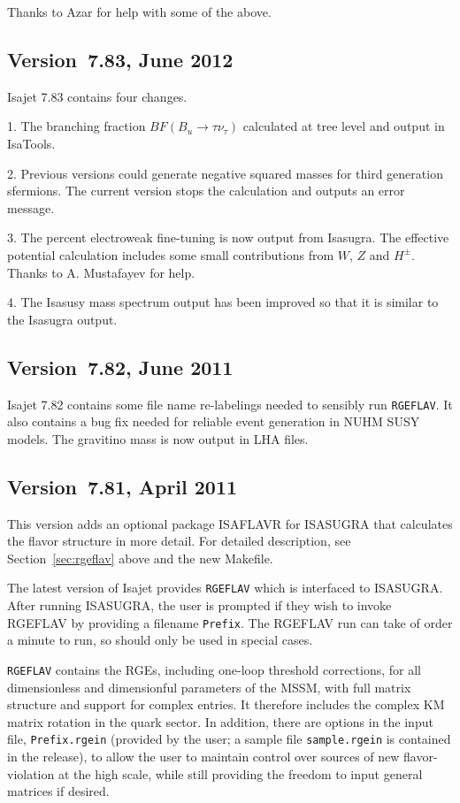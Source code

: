 Thanks to Azar for help with some of the above.

\subsection{Version~7.83, June 2012}

Isajet 7.83 contains four changes. 

1. The branching fraction $BF(B_u\rightarrow\tau\nu_\tau )$ calculated
at tree level and output in IsaTools.

2. Previous versions could generate negative squared masses for third 
generation sfermions. The current version stops the calculation and
outputs an error message.

3. The percent electroweak fine-tuning is now output from Isasugra.
The effective potential calculation includes some small contributions from
$W$, $Z$ and $H^\pm$. Thanks to A. Mustafayev for help.

4. The Isasusy mass spectrum output has been improved so that it is similar to
the Isasugra output.

\subsection{Version~7.82, June 2011}

Isajet 7.82 contains some file name re-labelings needed to sensibly run \texttt{RGEFLAV}.
It also contains a bug fix needed for reliable event generation in NUHM SUSY models.
The gravitino mass is now output in LHA files.

\subsection{Version~7.81, April 2011}

This version adds an optional package ISAFLAVR for ISASUGRA that
calculates the flavor structure in more detail. For detailed description, 
see Section~\ref{sec:rgeflav} above and the new Makefile.

The latest version of Isajet provides \texttt{RGEFLAV} which is interfaced to ISASUGRA.
After running ISASUGRA, the user is prompted if they wish to invoke RGEFLAV by providing a
filename \texttt{Prefix}. The RGEFLAV run can take
of order a minute to run, so should only be used in special cases.

\texttt{RGEFLAV} contains the RGEs, including one-loop threshold corrections, 
for all dimensionless and dimensionful parameters of the MSSM, 
with full matrix structure and support for complex entries. 
It therefore includes the complex KM matrix rotation in the quark sector. 
In addition, there are options in the input file, \texttt{Prefix.rgein} 
(provided by the user; a sample file \texttt{sample.rgein} is contained in the release), 
to allow the user to maintain control over sources of new flavor-violation at the high scale, 
while still providing the freedom to input general matrices if desired.

